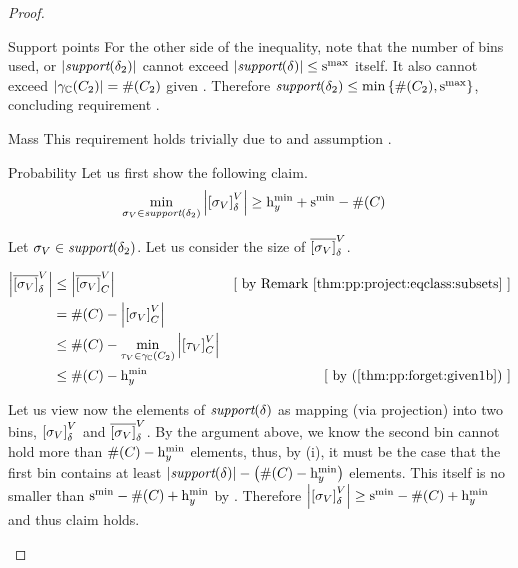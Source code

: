 \begin{proof}
\begin{subproof}{ Support points}
For the other side of the inequality, note that the number of bins
used, or $ \left| \textit{support}(\delta_2) \right| $ cannot exceed
$ \left| \textit{support}(\delta) \right| \leq \mathrm{s}^\mathrm{max}_{} $ itself. It also cannot
exceed $ \left| \gamma_{\mathbb{C}}(C_{2}) \right| = \#(C_{2}) $
given . Therefore
$ \textit{support}(\delta_2) \leq \min\left\{ \#(C_{2}), \mathrm{s}^\mathrm{max}_{} \right\} $,
concluding requirement .
\end{subproof}

\begin{subproof}{ Mass} This requirement holds
trivially due to  and
assumption .
\end{subproof}

\begin{subproof}{ Probability} Let us first show the following claim.
\begin{align}
\label{thm:pp:forget:cond2b}
& \min_{\sigma_V \in \support{\delta_2}} \setsize{\eqclass{\sigma_V}{\delta}{V}} \geq \minh{y}
+ \smin{} - \psize{\getpoly{}}
\end{align}

Let $ \sigma_V \in \textit{support}(\delta_2) $. Let us consider the size of
$ \overline{\left[ \sigma_V \right]}_{\delta}^{V} $.

\begin{align*}
\setsize{\eqclassc{\sigma_V}{\delta}{V}}
& \leq \setsize{\eqclassc{\sigma_V}{\getpoly{}}{V}}
& \mathstep{by \rref{thm:pp:project:eqclass:subsets}}\\
& = \psize{\getpoly{}} - \setsize{\eqclass{\sigma_V}{\getpoly{}}{V}} \\
& \leq \psize{\getpoly{}}
- \min_{\tau_V \in \pconc{\getpoly{2}}} \setsize{\eqclass{\tau_V}{\getpoly{}}{V}} \\
& \leq \psize{\getpoly{}} - \minh{y} & \mathstep{by \cnumref{thm:pp:forget:given1b}}
\end{align*}

Let us view now the elements of $ \textit{support}(\delta) $ as mapping (via
projection) into two bins, $ \left[ \sigma_V \right]_{\delta}^{V} $ and
$ \overline{\left[ \sigma_V \right]}_{\delta}^{V} $. By the argument above, we know the
second bin cannot hold more than $ \#(C_{}) - \mathrm{h}^\mathrm{min}_{y} $ elements,
thus, by  (i), it must be the case that the
first bin contains at least $ \left| \textit{support}(\delta) \right|
- \left( \#(C_{}) - \mathrm{h}^\mathrm{min}_{y} \right) $ elements. This itself is no
smaller than $ \mathrm{s}^\mathrm{min}_{} - \#(C_{}) + \mathrm{h}^\mathrm{min}_{y} $
by . Therefore
$ \left| \left[ \sigma_V \right]_{\delta}^{V} \right| \geq \mathrm{s}^\mathrm{min}_{} - \#(C_{}) + \mathrm{h}^\mathrm{min}_{y} $
and thus claim  holds.


\end{subproof}
\end{proof}
